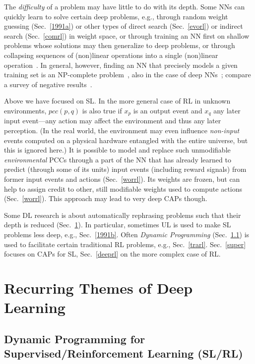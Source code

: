 \documentclass[letterpaper]{article}
\begin{document}
The {\em difficulty} of a problem may have little to do with its depth. 
Some NNs can quickly learn to solve certain deep problems,
e.g., through random weight guessing (Sec.~\ref{1991a})
or other types of direct search (Sec.~\ref{evorl}) or indirect search (Sec.~\ref{comrl}) in weight space,
or through training an NN first on shallow problems whose solutions may then generalize to deep problems,
or through collapsing sequences of (non)linear operations into a single (non)linear 
operation~\citep[but see an analysis of non-trivial aspects of deep linear networks,][Section B]{baldihornik95}.
In general, however, finding an NN that precisely models a given training set is an 
NP-complete problem~\citep{judd1990,blum1992},
also in the case of deep NNs~\citep{sima1994,souto1999,windisch2005};
compare a survey of negative results~\citep[Section 1]{sima2002}.


Above we have focused on SL.
In the more general case of RL in unknown environments, 
$pcc(p,q)$ is also true if $x_p$ is an output event and $x_q$ 
any later input event---any action may affect the environment and thus any later perception.
(In the real world, the environment may even influence {\em non-input} events 
computed on a physical hardware entangled with the entire universe, 
but this is ignored here.) 
It is possible to model and replace
such unmodifiable {\em environmental} PCCs
through a part of the NN that has already learned to predict (through some of its units) 
 input events (including reward signals) from
former input events and actions (Sec.~\ref{worrl}). Its weights are frozen,
but can help to assign credit to other, still modifiable weights used to compute actions (Sec.~\ref{worrl}).
This approach may lead to very deep CAPs though. 


Some DL research is about automatically rephrasing problems such that their
 depth is reduced (Sec.~\ref{themes}).
In particular,
sometimes UL is used to make SL problems less deep, e.g., Sec.~\ref{1991b}.
Often {\em Dynamic Programming} (Sec.~\ref{dp}) is used to facilitate certain traditional
RL problems, e.g., Sec.~\ref{trarl}.
Sec.~\ref{super} focuses on CAPs for
SL, Sec.~\ref{deeprl} on the more complex case of RL. 


\section{Recurring Themes of Deep Learning}
\label{themes}

\subsection{Dynamic Programming for Supervised/Reinforcement Learning (SL/RL)}
\label{dp}
\end{document}
